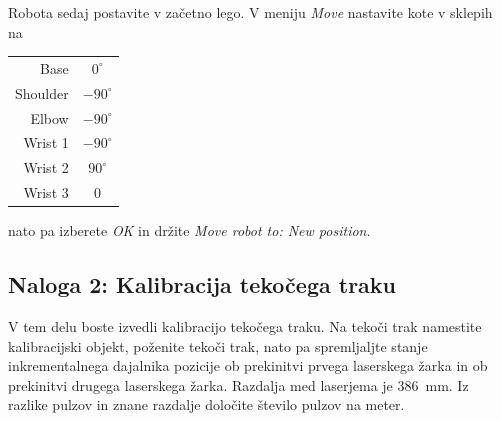 Robota sedaj postavite v začetno lego.  V meniju \emph{Move} nastavite kote v sklepih na

\begin{tabular}{|r|c|}
  \hline
  Base & $0^\circ$ \\
  Shoulder & $-90^\circ$ \\
  Elbow & $-90^\circ$ \\
  Wrist 1 & $-90^\circ$ \\
  Wrist 2 & $90^\circ$ \\
  Wrist 3 & 0 \\
  \hline
\end{tabular}

nato pa izberete \emph{OK} in držite \emph{Move robot to: New position}.


\subsection{Naloga 2:  Kalibracija tekočega traku}

V tem delu boste izvedli kalibracijo tekočega traku. Na tekoči trak namestite kalibracijski objekt, poženite tekoči trak, nato pa spremljaljte stanje inkrementalnega dajalnika pozicije ob prekinitvi prvega laserskega žarka in ob prekinitvi drugega laserskega žarka. Razdalja med laserjema je 386~mm. Iz razlike pulzov in znane razdalje določite število pulzov na meter.

